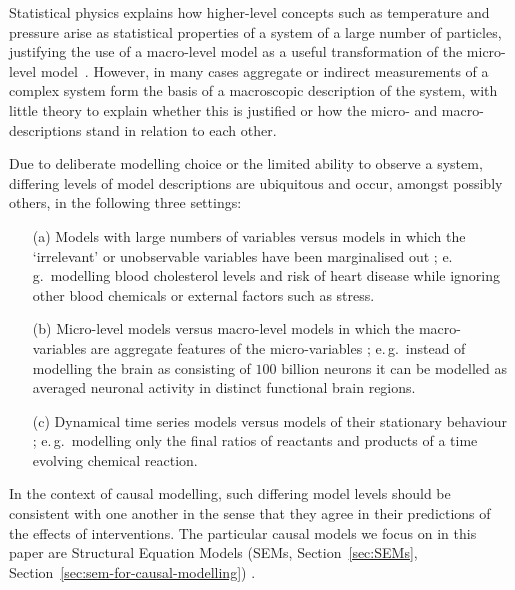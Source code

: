 Statistical physics explains how higher-level concepts such as temperature and pressure arise as statistical properties of a system of a large number of particles, justifying the use of a macro-level model as a useful transformation of the micro-level model~\citep{Balian}.
However, in many cases aggregate or indirect measurements of a complex system form the basis of a macroscopic description of the system, with little theory to explain whether this is justified or how the micro- and macro-descriptions stand in relation to each other.

Due to deliberate modelling choice or the limited ability to observe a system, differing levels of model descriptions are ubiquitous and occur, amongst possibly others, in the following three settings:
\vspace{-.5em}
\begin{itemize}[noitemsep]
    \item[(a)] Models with large numbers of variables versus models in which the `irrelevant' or unobservable variables have been marginalised out \citep{bongers2016structural}; e.\,g.\ modelling blood cholesterol levels and risk of heart disease while ignoring other blood chemicals or external factors such as stress.

    \item[(b)] Micro-level models versus macro-level models in which the macro-variables are aggregate features of the micro-variables \citep{simon1961aggregation,iwasaki1994causality,hoel2013quantifying,chalupka2015visual,chalupka2016multi}; e.\,g.\ instead of modelling the brain as consisting of $100$ billion neurons it can be modelled as averaged neuronal activity in distinct functional brain regions.

    \item[(c)] Dynamical time series models versus models of their stationary behaviour \citep{fisher1970correspondence,iwasaki1994causality,dash2001caveats,lacerda2012discovering,mooij2013ode,mooij2013cyclic}; e.\,g.\ modelling only the final ratios of reactants and products of a time evolving chemical reaction.
\end{itemize}
\vspace{-.5em}
In the context of causal modelling, such differing model levels  should be consistent with one another in the sense that they agree in their predictions of the effects of interventions. The particular causal models we focus on in this paper are Structural Equation Models (SEMs, Section~\ref{sec:SEMs}, Section~\ref{sec:sem-for-causal-modelling}) \citep{spirtes2000causation,pearl2009causality}.

